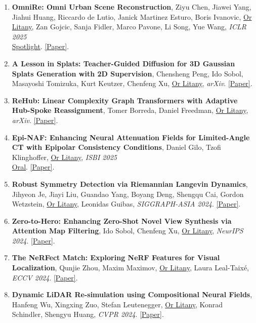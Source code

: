 \begin{enumerate}[leftmargin=*]

    \item \textbf{OmniRe: Omni Urban Scene Reconstruction}, Ziyu Chen, Jiawei Yang, Jiahui Huang, Riccardo de Lutio, Janick Martinez Esturo, Boris Ivanovic, \underline{Or Litany}, Zan Gojcic, Sanja Fidler, Marco Pavone, Li Song, Yue Wang, \textit{ICLR 2025}\\ \underline{Spotlight}. \href{https://arxiv.org/abs/2408.16760}{[Paper]}.
    \item \textbf{A Lesson in Splats: Teacher-Guided Diffusion for 3D Gaussian Splats Generation with 2D Supervision}, Chensheng Peng, Ido Sobol, Masayoshi Tomizuka, Kurt Keutzer, Chenfeng Xu, \underline{Or Litany}, \textit{arXiv}. \href{https://arxiv.org/abs/2412.00623}{[Paper]}.
    \item \textbf{ReHub: Linear Complexity Graph Transformers with Adaptive Hub-Spoke Reassignment}, Tomer Borreda, Daniel Freedman, \underline{Or Litany}, \textit{arXiv}. \href{https://arxiv.org/abs/2412.01519}{[Paper]}.
    \item \textbf{Epi-NAF: Enhancing Neural Attenuation Fields for Limited-Angle CT with Epipolar Consistency Conditions}, Daniel Gilo, Tzofi Klinghoffer, \underline{Or Litany}, \textit{ISBI 2025}\\ \underline{Oral}. \href{https://arxiv.org/abs/2411.06181v1}{[Paper]}.
    \item \textbf{Robust Symmetry Detection via Riemannian Langevin Dynamics}, Jihyeon Je, Jiayi Liu, Guandao Yang, Boyang Deng, Shengqu Cai, Gordon Wetzstein, \underline{Or Litany}, Leonidas Guibas, \textit{SIGGRAPH-ASIA 2024}. \href{https://arxiv.org/abs/2410.02786}{[Paper]}.
    \item \textbf{Zero-to-Hero: Enhancing Zero-Shot Novel View Synthesis via Attention Map Filtering}, Ido Sobol, Chenfeng Xu, \underline{Or Litany}, \textit{NeurIPS 2024}. \href{https://arxiv.org/abs/2405.18677}{[Paper]}.
    \item \textbf{The NeRFect Match: Exploring NeRF Features for Visual Localization}, Qunjie Zhou, Maxim Maximov, \underline{Or Litany}, Laura Leal-Taixé, \textit{ECCV 2024}. \href{https://arxiv.org/abs/2403.09577}{[Paper]}.
    \item \textbf{Dynamic LiDAR Re-simulation using Compositional Neural Fields}, Hanfeng Wu, Xingxing Zuo, Stefan Leutenegger, \underline{Or Litany}, Konrad Schindler, Shengyu Huang, \textit{CVPR 2024}. \href{https://arxiv.org/abs/2312.05247}{[Paper]}.

\end{enumerate}
